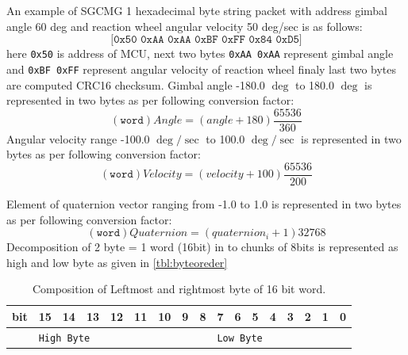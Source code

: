 \noindent An example of SGCMG 1 hexadecimal byte string packet with address gimbal angle 60 deg and reaction wheel angular velocity 50 deg/sec is as follows:
\begin{equation*}
\texttt{[0x50 0xAA 0xAA 0xBF 0xFF 0x84 0xD5]}
\end{equation*}
\noindent here \texttt{0x50} is address of MCU, next two bytes \texttt{0xAA 0xAA} represent gimbal angle and \texttt{0xBF 0xFF} represent angular velocity of reaction wheel finaly last two bytes are computed CRC16 checksum.
Gimbal angle -180.0 $\deg$ to 180.0 $\deg$ is represented in two bytes as per following conversion factor:
\begin{equation}
    (\texttt{word})Angle=(angle+180)\frac{65536}{360}
\end{equation}
Angular velocity range -100.0 $\deg/\sec$ to 100.0 $\deg/\sec$ is represented in two bytes as per following conversion factor:
\begin{equation}
    (\texttt{word})Velocity=(velocity+100)\frac{65536}{200}
\end{equation}

Element of quaternion vector ranging from -1.0 to 1.0  is represented in two bytes as per following conversion factor:
\begin{equation}
    (\texttt{word})Quaternion=(quaternion_i+1)32768
\end{equation}
Decomposition of 2 byte = 1 word (16bit) in to chunks of 8bits is represented as high and low byte as given in \autoref{tbl:byteoreder} 

\begin{table}[ht]
        \centering
\begin{tabular}{|p{}|p{}|p{}|p{}|p{}|p{}|p{}|p{}|p{}|p{}|p{}|p{}|p{}|p{}|p{}|p{}|p{}|}
\hline 
 bit & 15 & 14 & 13 & 12 & 11 & 10 & 9 & 8 & 7 & 6 & 5 & 4 & 3 & 2 & 1 & 0 \\
\hline 
  & \multicolumn{8}{l|}{\texttt{High Byte}} & \multicolumn{8}{l|}{\texttt{Low Byte}} \\
 \hline
\end{tabular}
        \caption{Composition of Leftmost and rightmost byte of 16 bit word.}
         \label{tbl:byteoreder}

        \end{table}

